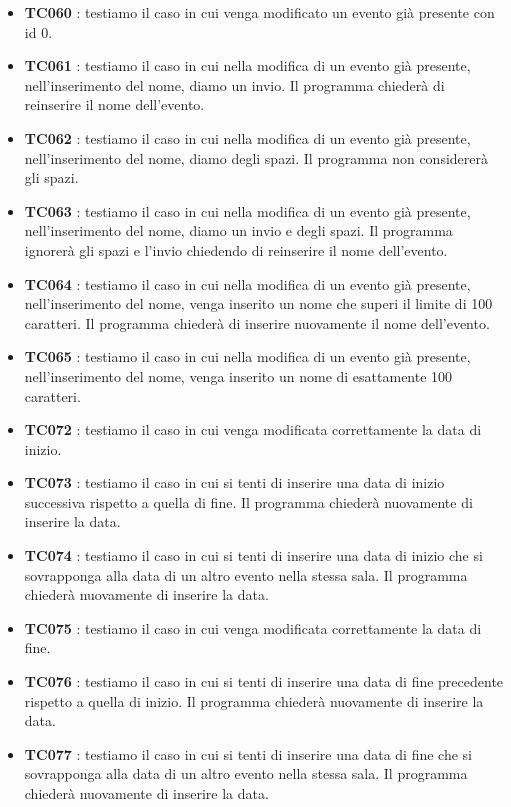 \documentclass[11pt]{scrartcl} %
\begin{document}
\begin{itemize}

	\item \textbf{TC060} : testiamo il caso in cui venga modificato un evento già presente con id 0.

	\item \textbf{TC061} : testiamo il caso in cui nella modifica di un evento già presente, nell'inserimento del nome, diamo un invio. Il programma chiederà di reinserire il nome dell'evento.

	\item \textbf{TC062} : testiamo il caso in cui nella modifica di un evento già presente, nell'inserimento del nome, diamo degli spazi. Il programma non considererà gli spazi.

	\item \textbf{TC063} : testiamo il caso in cui nella modifica di un evento già presente, nell'inserimento del nome, diamo un invio e degli spazi. Il programma ignorerà gli spazi e l'invio chiedendo di reinserire il nome dell'evento.

	\item \textbf{TC064} : testiamo il caso in cui nella modifica di un evento già presente, nell'inserimento del nome, venga inserito un nome che superi il limite di 100 caratteri. Il programma chiederà di inserire nuovamente il nome dell'evento.

	\item \textbf{TC065} : testiamo il caso in cui nella modifica di un evento già presente, nell'inserimento del nome, venga inserito un nome di esattamente 100 caratteri.

	\item \textbf{TC072} : testiamo il caso in cui venga modificata correttamente la data di inizio.

	\item \textbf{TC073} : testiamo il caso in cui si tenti di inserire una data di inizio successiva rispetto a quella di fine. Il programma chiederà nuovamente di inserire la data.

	\item \textbf{TC074} : testiamo il caso in cui si tenti di inserire una data di inizio che si sovrapponga alla data di un altro evento nella stessa sala. Il programma chiederà nuovamente di inserire la data.

	\item \textbf{TC075} : testiamo il caso in cui venga modificata correttamente la data di fine.

	\item \textbf{TC076} : testiamo il caso in cui si tenti di inserire una data di fine precedente rispetto a quella di inizio. Il programma chiederà nuovamente di inserire la data.

	\item \textbf{TC077} : testiamo il caso in cui si tenti di inserire una data di fine che si sovrapponga alla data di un altro evento nella stessa sala. Il programma chiederà nuovamente di inserire la data.


\end{itemize}
\end{document}
